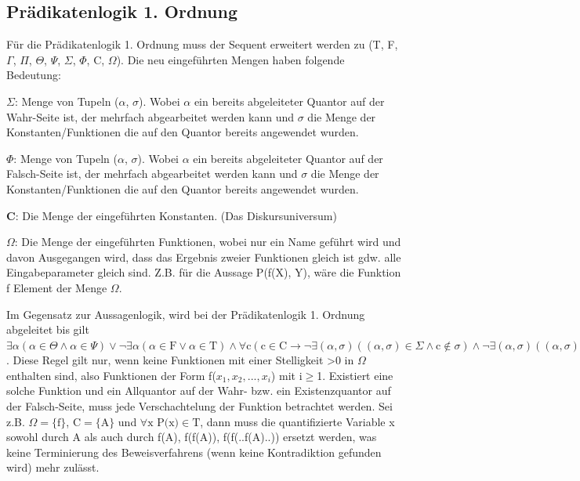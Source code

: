 \subsection{Prädikatenlogik 1. Ordnung}
Für die Prädikatenlogik 1. Ordnung muss der Sequent erweitert werden zu (T, F, $\Gamma$, $\Pi$, $\Theta$, $\Psi$, $\Sigma$, $\Phi$, C, $\Omega$). Die neu eingeführten Mengen haben folgende Bedeutung:
\begin{description}
\item \textbf{$\Sigma$}: Menge von Tupeln ($\alpha$, $\sigma$). Wobei $\alpha$ ein bereits abgeleiteter Quantor auf der Wahr-Seite ist, der mehrfach abgearbeitet werden kann und $\sigma$ die Menge der Konstanten/Funktionen die auf den Quantor bereits angewendet wurden.

\item \textbf{$\Phi$}: Menge von Tupeln ($\alpha$, $\sigma$). Wobei $\alpha$ ein bereits abgeleiteter Quantor auf der Falsch-Seite ist, der mehrfach abgearbeitet werden kann und $\sigma$ die Menge der Konstanten/Funktionen die auf den Quantor bereits angewendet wurden.

\item \textbf{C}: Die Menge der eingeführten Konstanten. (Das Diskursuniversum)

\item \textbf{$\Omega$}: Die Menge der eingeführten Funktionen, wobei nur ein Name geführt wird und davon Ausgegangen wird, dass das Ergebnis zweier Funktionen gleich ist gdw. alle Eingabeparameter gleich sind. Z.B. für die Aussage P(f(X), Y), wäre die Funktion f Element der Menge $\Omega$.
\end{description}

Im Gegensatz zur Aussagenlogik, wird bei der Prädikatenlogik 1. Ordnung abgeleitet bis gilt $\exists\alpha(\alpha\in\Theta\wedge\alpha\in\Psi)\vee\neg\exists\alpha(\alpha\in\textrm{F}\vee\alpha\in\textrm{T})\wedge\forall\textrm{c}(\textrm{c}\in\textrm{C}\rightarrow\neg\exists(\alpha,\sigma)((\alpha,\sigma)\in\Sigma\wedge\textrm{c}\notin\sigma)\wedge\neg\exists(\alpha,\sigma)((\alpha,\sigma)\in\Phi\wedge\textrm{c}\notin\sigma))$. Diese Regel gilt nur, wenn keine Funktionen mit einer Stelligkeit >0 in $\Omega$ enthalten sind, also Funktionen der Form f($x_{1},x_{2},...,x_{i}$) mit i$\geq$1. Existiert eine solche Funktion und ein Allquantor auf der Wahr- bzw. ein Existenzquantor auf der Falsch-Seite, muss jede Verschachtelung der Funktion betrachtet werden. Sei z.B. $\Omega=\lbrace\textrm{f}\rbrace$, $\textrm{C}=\lbrace\textrm{A}\rbrace$ und $\forall\textrm{x P(x)}\in\textrm{T}$, dann muss die quantifizierte Variable x sowohl durch A als auch durch f(A), f(f(A)), f(f(..f(A)..)) ersetzt werden, was keine Terminierung des Beweisverfahrens (wenn keine Kontradiktion gefunden wird) mehr zulässt.

